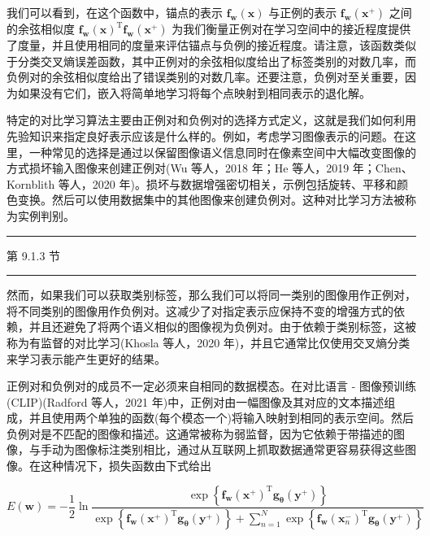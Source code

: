 \documentclass[10pt]{report}
\newcommand{\HRule}{\begin{center}\rule{0.9\linewidth}{0.2mm}\end{center}}
\begin{document}
我们可以看到，在这个函数中，锚点的表示 \({\mathbf{f}}_{\mathbf{w}}\left( \mathbf{x}\right)\) 与正例的表示 \({\mathbf{f}}_{\mathbf{w}}\left( {\mathbf{x}}^{ + }\right)\) 之间的余弦相似度 \({\mathbf{f}}_{\mathbf{w}}{\left( \mathbf{x}\right) }^{\mathrm{T}}{\mathbf{f}}_{\mathbf{w}}\left( {\mathbf{x}}^{ + }\right)\) 为我们衡量正例对在学习空间中的接近程度提供了度量，并且使用相同的度量来评估锚点与负例的接近程度。请注意，该函数类似于分类交叉熵误差函数，其中正例对的余弦相似度给出了标签类别的对数几率，而负例对的余弦相似度给出了错误类别的对数几率。还要注意，负例对至关重要，因为如果没有它们，嵌入将简单地学习将每个点映射到相同表示的退化解。

特定的对比学习算法主要由正例对和负例对的选择方式定义，这就是我们如何利用先验知识来指定良好表示应该是什么样的。例如，考虑学习图像表示的问题。在这里，一种常见的选择是通过以保留图像语义信息同时在像素空间中大幅改变图像的方式损坏输入图像来创建正例对(Wu 等人，2018 年；He 等人，2019 年；Chen、Kornblith 等人，2020 年)。损坏与数据增强密切相关，示例包括旋转、平移和颜色变换。然后可以使用数据集中的其他图像来创建负例对。这种对比学习方法被称为实例判别。

\HRule

第 9.1.3 节

\HRule

然而，如果我们可以获取类别标签，那么我们可以将同一类别的图像用作正例对，将不同类别的图像用作负例对。这减少了对指定表示应保持不变的增强方式的依赖，并且还避免了将两个语义相似的图像视为负例对。由于依赖于类别标签，这被称为有监督的对比学习(Khosla 等人，2020 年)，并且它通常比仅使用交叉熵分类来学习表示能产生更好的结果。

正例对和负例对的成员不一定必须来自相同的数据模态。在对比语言 - 图像预训练(CLIP)(Radford 等人，2021 年)中，正例对由一幅图像及其对应的文本描述组成，并且使用两个单独的函数(每个模态一个)将输入映射到相同的表示空间。然后负例对是不匹配的图像和描述。这通常被称为弱监督，因为它依赖于带描述的图像，与手动为图像标注类别相比，通过从互联网上抓取数据通常更容易获得这些图像。在这种情况下，损失函数由下式给出

\[
E\left( \mathbf{w}\right)  =  - \frac{1}{2}\ln \frac{\exp \left\{  {{\mathbf{f}}_{\mathbf{w}}{\left( {\mathbf{x}}^{ + }\right) }^{\mathrm{T}}{\mathbf{g}}_{\mathbf{\theta }}\left( {\mathbf{y}}^{ + }\right) }\right\}  }{\exp \left\{  {{\mathbf{f}}_{\mathbf{w}}{\left( {\mathbf{x}}^{ + }\right) }^{\mathrm{T}}{\mathbf{g}}_{\mathbf{\theta }}\left( {\mathbf{y}}^{ + }\right) }\right\}   + \mathop{\sum }\limits_{{n = 1}}^{N}\exp \left\{  {{\mathbf{f}}_{\mathbf{w}}{\left( {\mathbf{x}}_{n}^{ - }\right) }^{\mathrm{T}}{\mathbf{g}}_{\mathbf{\theta }}\left( {\mathbf{y}}^{ + }\right) }\right\}  }
\]
\end{document}
